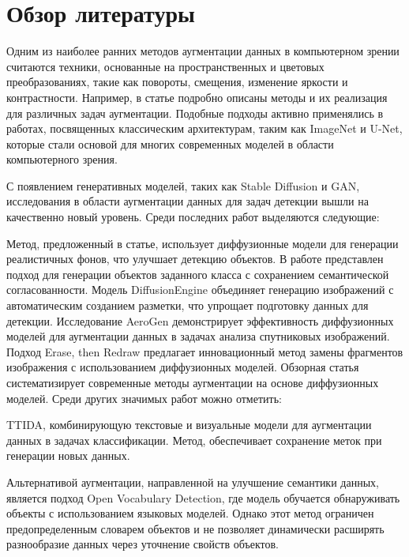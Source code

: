\section{Обзор литературы}
Одним из наиболее ранних методов аугментации данных в компьютерном зрении считаются техники, основанные на пространственных и цветовых преобразованиях, такие как повороты, смещения, изменение яркости и контрастности. Например, в статье \cite{DBLP:journals/corr/abs-1809-06839} подробно описаны методы и их реализация для различных задач аугментации. Подобные подходы активно применялись в работах, посвященных классическим архитектурам, таким как ImageNet\cite{DBLP:journals/corr/RussakovskyDSKSMHKKBBF14} и U-Net\cite{DBLP:journals/corr/RonnebergerFB15}, которые стали основой для многих современных моделей в области компьютерного зрения.

С появлением генеративных моделей, таких как Stable Diffusion\cite{DBLP:journals/corr/abs-2112-10752} и GAN\cite{goodfellow2014generativeadversarialnetworks}, исследования в области аугментации данных для задач детекции вышли на качественно новый уровень. Среди последних работ выделяются следующие:

Метод, предложенный в статье\cite{li2024simplebackgroundaugmentationmethod}, использует диффузионные модели для генерации реалистичных фонов, что улучшает детекцию объектов.
В работе\cite{10484172} представлен подход для генерации объектов заданного класса с сохранением семантической согласованности.
Модель DiffusionEngine\cite{zhang2023diffusionenginediffusionmodelscalable} объединяет генерацию изображений с автоматическим созданием разметки, что упрощает подготовку данных для детекции.
Исследование AeroGen\cite{tang2025aerogenenhancingremotesensing} демонстрирует эффективность диффузионных моделей для аугментации данных в задачах анализа спутниковых изображений.
Подход Erase, then Redraw\cite{ma2025eraseredrawnoveldata} предлагает инновационный метод замены фрагментов изображения с использованием диффузионных моделей.
Обзорная статья\cite{alimisis2025advancesdiffusionmodelsimage} систематизирует современные методы аугментации на основе диффузионных моделей. Среди других значимых работ можно отметить:

TTIDA\cite{yin2023ttidacontrollablegenerativedata}, комбинирующую текстовые и визуальные модели для аугментации данных в задачах классификации.
Метод\cite{kupyn2024datasetenhancementinstancelevelaugmentations}, обеспечивает сохранение меток при генерации новых данных.

Альтернативой аугментации, направленной на улучшение семантики данных, является подход Open Vocabulary Detection\cite{zhu2024surveyopenvocabularydetectionsegmentation}, где модель обучается обнаруживать объекты с использованием языковых моделей. Однако этот метод ограничен предопределенным словарем объектов и не позволяет динамически расширять разнообразие данных через уточнение свойств объектов. 



